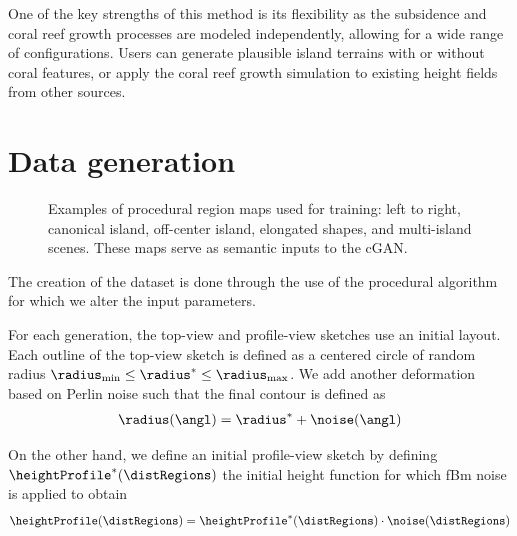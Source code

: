 One of the key strengths of this method is its flexibility as the subsidence and coral reef growth processes are modeled independently, allowing for a wide range of configurations. Users can generate plausible island terrains with or without coral features, or apply the coral reef growth simulation to existing height fields from other sources.



\section{Data generation}
\label{sec:coral-island-dataset-generation}



\begin{figure}
    \caption{Examples of procedural region maps used for training: left to right, canonical island, off-center island, elongated shapes, and multi-island scenes. These maps serve as semantic inputs to the cGAN.}
    \label{fig:coral-island-difficulties-dataset}
\end{figure}


The creation of the dataset is done through the use of the procedural algorithm for which we alter the input parameters. 

For each generation, the top-view and profile-view sketches use an initial layout. Each outline of the top-view sketch is defined as a centered circle of random radius $\radius_\text{min} \leq \radius^* \leq \radius_\text{max}$. We add another deformation based on Perlin noise such that the final contour is defined as 
\begin{align}
    \radius(\angl) = \radius^* + \noise(\angl)
\end{align}

On the other hand, we define an initial profile-view sketch by defining $\heightProfile^*(\distRegions)$ the initial height function for which fBm noise is applied to obtain 
\begin{align}
    \heightProfile(\distRegions) = \heightProfile^*(\distRegions) \cdot \noise(\distRegions)
\end{align}

